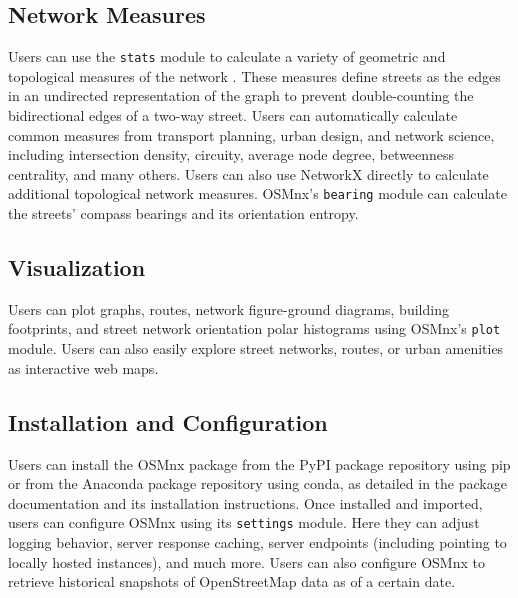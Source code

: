 \documentclass[12pt,letterpaper]{article} %
\begin{document}
\subsection{Network Measures}

Users can use the \texttt{stats} module to calculate a variety of geometric and topological measures of the network \citep{boeing_street_2021}. These measures define streets as the edges in an undirected representation of the graph to prevent double-counting the bidirectional edges of a two-way street. Users can automatically calculate common measures from transport planning, urban design, and network science, including intersection density, circuity, average node degree, betweenness centrality, and many others. Users can also use NetworkX directly to calculate additional topological network measures. OSMnx's \texttt{bearing} module can calculate the streets' compass bearings and its orientation entropy.

\subsection{Visualization}

Users can plot graphs, routes, network figure-ground diagrams, building footprints, and street network orientation polar histograms \citep{boeing_urban_2019,boeing_spatial_2021} using OSMnx's \texttt{plot} module. Users can also easily explore street networks, routes, or urban amenities as interactive web maps.

\subsection{Installation and Configuration}

Users can install the OSMnx package from the PyPI package repository using pip or from the Anaconda package repository using conda, as detailed in the package documentation and its installation instructions. Once installed and imported, users can configure OSMnx using its \texttt{settings} module. Here they can adjust logging behavior, server response caching, server endpoints (including pointing to locally hosted instances), and much more. Users can also configure OSMnx to retrieve historical snapshots of OpenStreetMap data as of a certain date.





\setlength{\bibsep}{0.00cm plus 0.05cm} %


\end{document}

